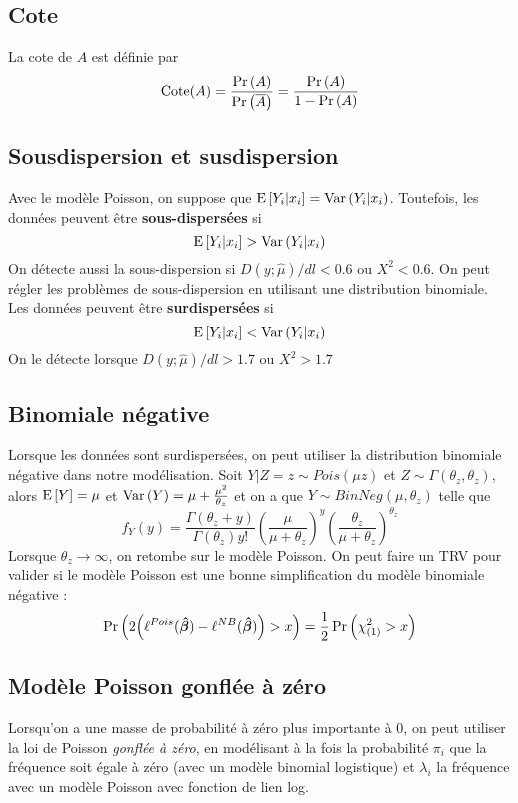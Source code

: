 \documentclass[10pt, french]{article}
\begin{document}
\begin{multicols*}{3}
\subsection*{Cote}
La cote de $A$ est définie par
\[\mathrm{Cote}(A) = \frac{\Pr \left( A \right)}{\Pr \left( \overline{A} \right)} = \frac{\Pr \left( A \right)}{1 - \Pr \left( A \right)} \]


\subsection*{Sousdispersion et susdispersion}
Avec le modèle Poisson, on suppose que $\mathrm{E} \left[ Y_i |x_i \right] = \mathrm{Var} \left( Y_i | x_i \right)$. Toutefois, les données peuvent être \textbf{sous-dispersées} si
\[  \mathrm{E} \left[ Y_i |x_i \right] > \mathrm{Var} \left( Y_i | x_i \right) \]
On détecte aussi la sous-dispersion si $D(y ; \hat{\mu}) / dl < 0.6$ ou $X^2 < 0.6$. On peut régler les problèmes de sous-dispersion en utilisant une distribution binomiale. Les données peuvent être \textbf{surdispersées} si
\[ \mathrm{E} \left[ Y_i |x_i \right] < \mathrm{Var} \left( Y_i | x_i \right)  \]
On le détecte lorsque $D(y ; \hat{\mu}) / dl > 1.7$ ou $X^2 > 1.7$

\subsection*{Binomiale négative}
Lorsque les données sont surdispersées, on peut utiliser la distribution binomiale négative dans notre modélisation. Soit $Y | Z = z \sim Pois(\mu z)$ et $Z \sim \Gamma(\theta_z, \theta_z)$, alors $\mathrm{E} \left[ Y \right] = \mu$ et $\mathrm{Var} \left( Y \right) = \mu + \frac{\mu^2}{\theta_z}$ et on a que $Y \sim BinNeg(\mu, \theta_z)$ telle que
\[f_Y(y) = \frac{\Gamma(\theta_z + y)}{\Gamma(\theta_z) y!} \left( \frac{\mu}{\mu + \theta_z} \right)^{y} \left( \frac{\theta_z}{\mu + \theta_z} \right)^{\theta_z}  \]
Lorsque $\theta_z \to \infty$, on retombe sur le modèle Poisson. On peut faire un TRV pour valider si le modèle Poisson est une bonne simplification du modèle binomiale négative : 
\[ \Pr \left(  2\Big(\ell^{Pois}(\bm{\hat{\beta}}) - \ell^{NB}(\bm{\hat{\beta}}) \Big) > x \right) = \frac{1}{2} \Pr \left( \chi_{(1)}^2 > x \right) \] 

\subsection*{Modèle Poisson gonflée à zéro}
Lorsqu'on a une masse de probabilité à zéro plus importante à 0, on peut utiliser la loi de Poisson \emph{gonflée à zéro}, en modélisant à la fois la probabilité $\pi_i$ que la fréquence soit égale à zéro (avec un modèle binomial logistique) et $\lambda_i$ la fréquence avec un modèle Poisson avec fonction de lien log.



\end{multicols*}
\end{document}
